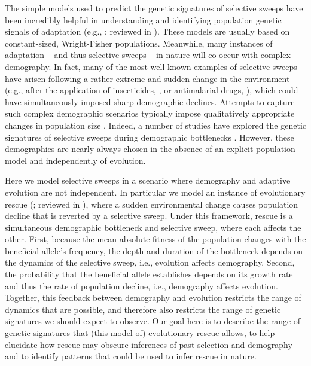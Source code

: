 \documentclass[]{article}
\begin{document}
The simple models used to predict the genetic signatures of selective sweeps have been incredibly helpful in understanding and identifying population genetic signals of adaptation (e.g., \citealp{smith1974hitch,kaplan1989hitchhiking}; reviewed in \citealp{stephan2019selective}). 
These models are usually based on constant-sized, Wright-Fisher populations.
Meanwhile, many instances of adaptation -- and thus selective sweeps -- in nature will co-occur with complex demography.
In fact, many of the most well-known examples of selective sweeps have arisen following a rather extreme and sudden change in the environment (e.g., after the application of insecticides, \citealp{sedghifar2016genomic}, or antimalarial drugs, \citealp{nair2003selective}), which could have simultaneously imposed sharp demographic declines.
Attempts to capture such complex demographic scenarios typically impose qualitatively appropriate changes in population size \citep[e.g.,][]{hermisson2005soft}.
Indeed, a number of studies have explored the genetic signatures of selective sweeps during demographic bottlenecks \citep[e.g.,][]{innan2004pattern,teshima2006reliable,wilson2014soft}.
However, these demographies are nearly always chosen in the absence of an explicit population model and independently of evolution.

Here we model selective sweeps in a scenario where demography and adaptive evolution are not independent.
In particular we model an instance of evolutionary rescue (\citealp{gomulkiewicz1995does}; reviewed in \citealp{bell2017evolutionary}), where a sudden environmental change causes population decline that is reverted by a selective sweep.
Under this framework, rescue is a simultaneous demographic bottleneck and selective sweep, where each affects the other.
First, because the mean absolute fitness of the population changes with the beneficial allele's frequency, the depth and duration of the bottleneck depends on the dynamics of the selective sweep, i.e., evolution affects demography.
Second, the probability that the beneficial allele establishes depends on its growth rate and thus the rate of population decline, i.e., demography affects evolution.
Together, this feedback between demography and evolution restricts the range of dynamics that are possible, and therefore also restricts the range of genetic signatures we should expect to observe.
Our goal here is to describe the range of genetic signatures that (this model of) evolutionary rescue allows, to help elucidate how rescue may obscure inferences of past selection and demography and to identify patterns that could be used to infer rescue in nature.
\end{document}
